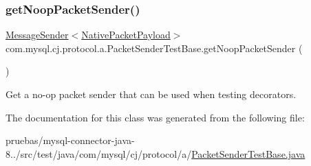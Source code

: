 \mbox{\label{classcom_1_1mysql_1_1cj_1_1protocol_1_1a_1_1_packet_sender_test_base_a0e37ea21e80f4299d9114934ea4ac93e}} 
\subsubsection{\texorpdfstring{get\+Noop\+Packet\+Sender()}{getNoopPacketSender()}}
{\footnotesize\ttfamily \mbox{\hyperlink{interfacecom_1_1mysql_1_1cj_1_1protocol_1_1_message_sender}{Message\+Sender}}$<$\mbox{\hyperlink{classcom_1_1mysql_1_1cj_1_1protocol_1_1a_1_1_native_packet_payload}{Native\+Packet\+Payload}}$>$ com.\+mysql.\+cj.\+protocol.\+a.\+Packet\+Sender\+Test\+Base.\+get\+Noop\+Packet\+Sender (\begin{DoxyParamCaption}{ }\end{DoxyParamCaption})\hspace{0.3cm}{\ttfamily [protected]}}

Get a no-\/op packet sender that can be used when testing decorators. 

The documentation for this class was generated from the following file\+:\begin{DoxyCompactItemize}
\item 
pruebas/mysql-\/connector-\/java-\/8../src/test/java/com/mysql/cj/protocol/a/\mbox{\hyperlink{_packet_sender_test_base_8java}{Packet\+Sender\+Test\+Base.\+java}}\end{DoxyCompactItemize}
